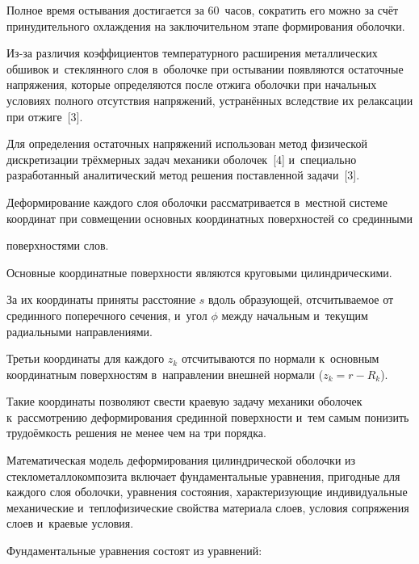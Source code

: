 Полное время остывания достигается за 60~часов, сократить его можно за счёт принудительного охлаждения на заключительном этапе формирования оболочки.









\smallskip




Из-за различия коэффициентов температурного расширения металлических обшивок и~стеклянного слоя в~оболочке при остывании появляются остаточные напряжения, которые определяются после отжига оболочки при начальных условиях полного отсутствия напряжений, устранённых вследствие их релаксации при отжиге~[3]. 

Для определения остаточных напряжений использован метод физической дискретизации трёхмерных задач механики оболочек~[4] и~специально разработанный аналитический метод решения поставленной задачи~[3].



Деформирование каждого слоя оболочки рассматривается в~местной системе координат при совмещении основных координатных поверхностей со срединными 

поверхностями слов. 

Основные координатные поверхности являются круговыми цилиндрическими. 

За их координаты приняты расстояние $s$ вдоль образующей, отсчитываемое от срединного поперечного сечения, и~угол $\phi$ между начальным и~текущим радиальными направлениями. 

Третьи координаты для каждого $z_{k}$ отсчитываются по нормали к~основным координатным поверхностям в~направлении внешней нормали ($z_{k}=r-R_{k}$). 

Такие координаты позволяют свести краевую задачу механики оболочек к~рассмотрению деформирования срединной поверхности и~тем самым понизить трудоёмкость решения не менее чем на три порядка.



Математическая модель деформирования цилиндрической оболочки из стеклометаллокомпозита включает фундаментальные уравнения, пригодные для каждого слоя оболочки, уравнения состояния, характеризующие индивидуальные механические и~теплофизические свойства материала слоев, условия сопряжения слоев и~краевые условия. 

Фундаментальные уравнения состоят из уравнений:



